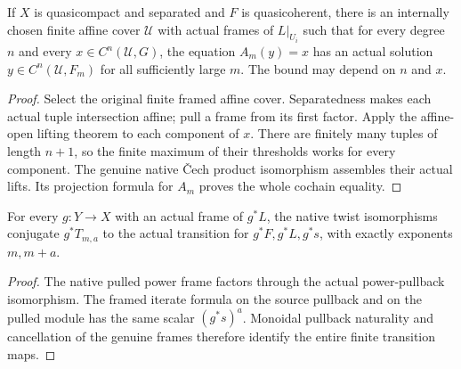 \begin{lemma}
\label{lem:cech-line-native-finite-cochain-lift}
\leanok
If $X$ is quasicompact and separated and $F$ is quasicoherent, there is
an internally chosen finite affine cover $\mathcal U$ with actual
frames of $L|_{U_i}$ such that for every degree $n$ and every
$x\in C^n(\mathcal U,G)$, the equation $A_m(y)=x$ has an actual
solution $y\in C^n(\mathcal U,F_m)$ for all sufficiently large $m$.
The bound may depend on $n$ and $x$.
\end{lemma}
\begin{proof}
Select the original finite framed affine cover. Separatedness makes
each actual tuple intersection affine; pull a frame from its first
factor. Apply the affine-open lifting theorem to each component of
$x$. There are finitely many tuples of length $n+1$, so the finite
maximum of their thresholds works for every component. The genuine
native \v{C}ech product isomorphism assembles their actual lifts.
Its projection formula for $A_m$ proves the whole cochain equality.
\end{proof}

\begin{lemma}
\label{lem:cech-line-native-transition-open-pullback}
\leanok
For every $g:Y\to X$ with an actual frame of $g^*L$, the native twist
isomorphisms conjugate $g^*T_{m,a}$ to the actual transition for
$g^*F,g^*L,g^*s$, with exactly exponents $m,m+a$.
\end{lemma}
\begin{proof}
The native pulled power frame factors through the actual power-pullback
isomorphism. The framed iterate formula on the source pullback and on
the pulled module has the same scalar $(g^*s)^a$. Monoidal pullback
naturality and cancellation of the genuine frames therefore identify
the entire finite transition maps.
\end{proof}

